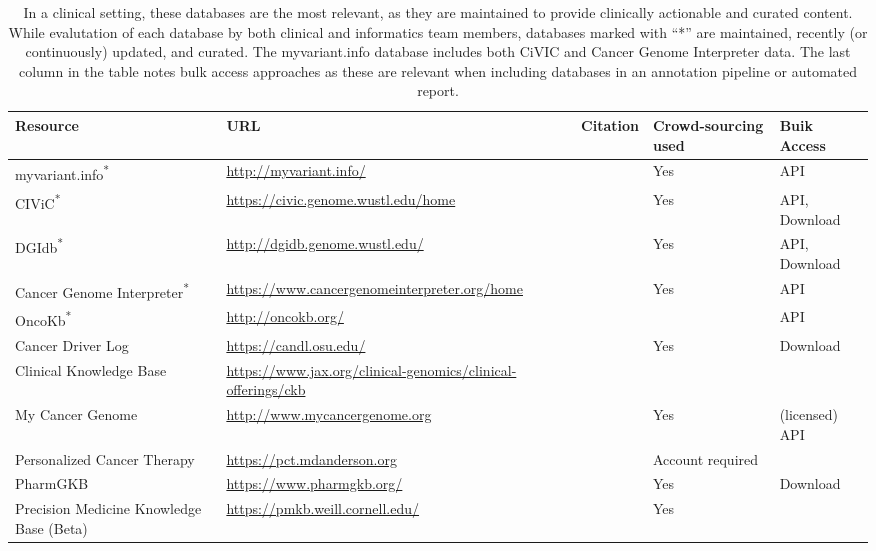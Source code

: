 \documentclass{article}
\begin{document}
\begin{table}[p]
  \footnotesize
\centering
\begin{tabularx}{\textwidth}{p{3cm}XXp{1.5cm}p{1.5cm}}
  \hline
  Resource & URL & Citation & Crowd-sourcing used & Buik Access \\
  \hline
  myvariant.info\textsuperscript{*} & \url{http://myvariant.info/} &
  \parencite{Xin2016-yc} & Yes & API \\
  CIViC\textsuperscript{*} & \url{https://civic.genome.wustl.edu/home} &
  \parencite{Griffith2016-sy} & Yes & API, Download \\
  DGIdb\textsuperscript{*} & \url{http://dgidb.genome.wustl.edu/} &
  \parencite{Wagner2016-fs,Griffith2013-uv} & Yes & API, Download\\
  Cancer Genome Interpreter\textsuperscript{*} & \url{https://www.cancergenomeinterpreter.org/home} & \parencite{Tamborero2017-ay} & Yes & API \\
  OncoKb\textsuperscript{*} & \url{http://oncokb.org/} & \parencite{Chakravarty2017-gx} &
  & API \\
  Cancer Driver Log & \url{https://candl.osu.edu/} & \parencite{Damodaran2015-so} & Yes & Download\\
  Clinical Knowledge Base &
  \url{https://www.jax.org/clinical-genomics/clinical-offerings/ckb} &
  & & \\
  My Cancer Genome & \url{http://www.mycancergenome.org} &
  \parencite{Micheel2014-pz} & Yes & (licensed) API \\
  Personalized Cancer Therapy & \url{https://pct.mdanderson.org} & &
  Account required \\
  PharmGKB & \url{https://www.pharmgkb.org/} &
  \parencite{Hewett2002-yu} & Yes & Download \\
  Precision Medicine Knowledge Base (Beta) & \url{https://pmkb.weill.cornell.edu/} & \parencite{Huang2016-zx} & Yes & \\
  \hline
\end{tabularx}
\caption{In a clinical setting, these databases
are the most relevant, as they are maintained to provide clinically
actionable and curated content. While evalutation of each database by both
clinical and informatics team members, databases marked with ``*'' are
maintained, recently (or continuously) updated, and curated. The
myvariant.info database includes both CiVIC and Cancer Genome
Interpreter data. The last column in the table notes bulk access
approaches as these are relevant when including databases in an
annotation pipeline or automated report. }
\label{table:3}
\end{table}
 
\end{document}
